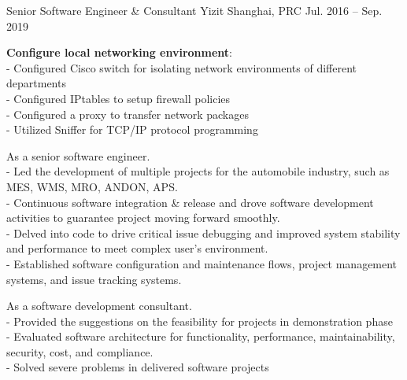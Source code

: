 \begin{cventries}
  \cventry
    {Senior Software Engineer \& Consultant} %
    {Yizit} %
    {Shanghai, PRC} %
    {Jul. 2016 – Sep. 2019} %
    {
      \begin{cvitems} %
        \item {
        \textbf{Configure local networking environment}:
        \\ - {Configured Cisco switch for isolating network environments of different departments} 
        \\ - {Configured IPtables to setup firewall policies}
        \\ - {Configured a proxy to transfer network packages}
        \\ - {Utilized Sniffer for TCP/IP protocol programming}
        }
        \item {As a senior software engineer. \\ - Led the development of multiple projects for the automobile industry, such as MES, WMS, MRO, ANDON, APS.  \\ - Continuous software integration \& release and drove software development activities to guarantee project moving forward smoothly. \\- Delved into code to drive critical issue debugging and improved system stability and performance to meet complex user’s environment. \\ - Established software configuration and maintenance flows, project management systems, and issue tracking systems.
        }
        \item {As a software development consultant. \\ - Provided the suggestions on the feasibility for projects in demonstration phase\\- Evaluated software architecture for functionality, performance, maintainability, security, cost, and compliance.\\- Solved severe problems in delivered software projects}
      \end{cvitems}
    }
\end{cventries}
